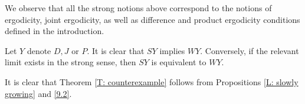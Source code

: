 \documentclass[11pt]{amsart}
\newtheorem{proposition}[lemma]{Proposition}
\theoremstyle{definition}
\newcommand{\1}{{\mathbf{1}}}
\newcommand{\floor}[1]{{\left \lfloor #1 \right \rfloor}}
\begin{document}
We observe that all the strong notions above correspond to the notions of ergodicity, joint ergodicity, as well as difference and product ergodicity conditions defined in the introduction.

Let $Y$ denote $D,J$ or $P$.
It is clear that $SY$ implies $WY$. Conversely, if the relevant limit exists in the strong sense, then $SY$ is equivalent to $WY$.




\iffalse

It is clear that Theorem \ref{T: counterexample} follows from Propositions \ref{L: slowly growing} and \ref{9.2}.
\end{document}
